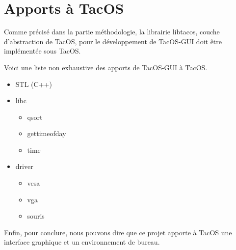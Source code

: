 \section{Apports à TacOS}

Comme précisé dans la partie méthodologie, la librairie libtacos, couche d'abstraction de TacOS, pour le développement de TacOS-GUI doit être implémentée sous TacOS.

Voici une liste non exhaustive des apports de TacOS-GUI à TacOS.
  
\begin{itemize}
  \item STL (C++)
  \item libc
    \begin{itemize}
      \item qsort
      \item gettimeofday
      \item time
    \end{itemize}
  \item driver
    \begin{itemize}
      \item vesa
      \item vga
      \item souris
    \end{itemize}
\end{itemize}

Enfin, pour conclure, nous pouvons dire que ce projet apporte à TacOS une interface graphique et un environnement de bureau.
